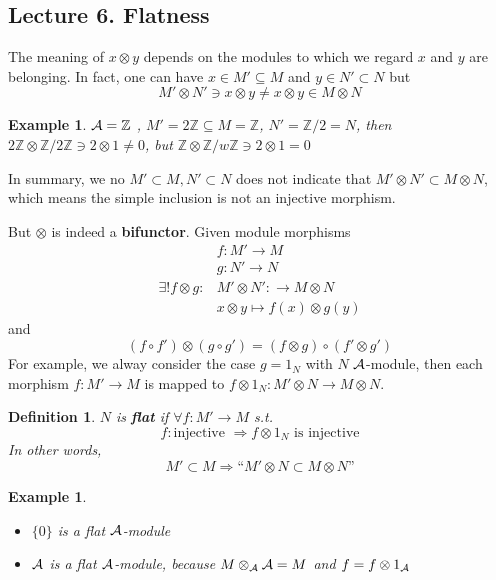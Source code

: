 \documentclass[11pt]{article}
\newtheorem{dfn}[thm]{Definition}
\newtheorem{ex}[thm]{Example}
\newcommand{\intg}{\mathbb Z}
\newcommand{\cala}{{\cal A}}
\newcommand{\Lrta}{\Longrightarrow}
\newcommand{\lrta}{\longrightarrow}
\begin{document}
\subsection{Lecture 6. Flatness}
The meaning of $x\otimes y$ depends on the modules to which we regard $x$ and $y$ are belonging. In fact, one can have $x\in M'\subseteq M$ and $y\in N'\subset N$ but 
$$
M'\otimes N'\ni x\otimes y\neq x\otimes y\in M\otimes N
$$
\begin{ex}
$\cala=\intg$ , $M'=2\intg\subseteq M=\intg$, $N'=\intg/2 =N$,
 then $2\intg \otimes \intg/2\intg \ni 2\otimes 1\neq 0 $, but $\intg \otimes \intg/w\intg\ni2\otimes 1=0$ 
\end{ex}
In summary, we no $M'\subset M, N'\subset N$ does not indicate that $M'\otimes N'\subset M\otimes N$, which means the simple inclusion is  not an injective  morphism. 

But $\otimes$ is indeed a \textbf{bifunctor}. Given module morphisms
$$
\begin{aligned}
& f: M'\lrta M\\
& g: N'\lrta N\\
\exists ! f\otimes g:&M'\otimes N':\lrta M\otimes N\\
&x\otimes y\longmapsto f(x)\otimes g(y)
\end{aligned}
$$ 
and 
$$
(f\circ f')\otimes(g\circ g')=(f\otimes g)\circ (f'\otimes g')
$$
For example, we alway consider the case $g=1_N$ with $N$ $\cala$-module, then each morphism $f:M'\lrta M$ is mapped to $f\otimes 1_N:M'\otimes N\lrta M\otimes N$.

\begin{dfn}
$N$ is \textbf{flat} if $\forall f: M'\lrta M$  s.t.
$$
f:\text{injective }\Lrta f\otimes 1_N \text{ is injective}
$$
In other words,
 $$
M'\subset M\Lrta \text{``$M'\otimes N\subset M\otimes N$''}
 $$
\end{dfn}

\begin{ex}\ 
\begin{itemize}
    \item 
$\{0\}$ is a flat $\cala$-module
\item 
$\cala$ is a flat $\cala$-module, because $M\otimes_\cala\cala=M$ and $f=f\otimes 1_\cala$ 
\end{itemize}
\end{ex}
\end{document}
